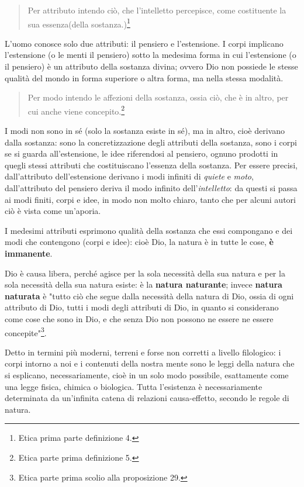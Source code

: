 \begin{quotation}
	\small Per attributo intendo ciò, che l'intelletto percepisce, come costituente la sua essenza(della sostanza.)\footnote{Etica prima parte definizione 4.}
\end{quotation}

L'uomo conosce solo due attributi: il pensiero e l'estensione. I corpi implicano l'estensione (o le menti il pensiero) sotto la medesima forma in cui l'estensione (o il pensiero) è un attributo della sostanza divina; ovvero Dio non possiede le stesse qualità del mondo in forma superiore o altra forma, ma nella stessa modalità.

\begin{quotation}
	\small Per modo intendo le affezioni della sostanza, ossia ciò, che è in altro, per cui anche viene concepito.\footnote{Etica parte prima definizione 5.}
\end{quotation}

I modi non sono in sé (solo la sostanza esiste in sé), ma in altro, cioè derivano dalla sostanza: sono la concretizzazione degli attributi della sostanza, sono i corpi se si guarda all'estensione, le idee riferendosi al pensiero, ognuno prodotti in quegli stessi attributi che costituiscano l'essenza della sostanza. Per essere precisi, dall'attributo dell'estensione derivano i modi infiniti di \textit{quiete} e \textit{moto}, dall'attributo del pensiero deriva il modo infinito dell'\textit{intelletto}: da questi si passa ai modi finiti, corpi e idee, in modo non molto chiaro, tanto che per alcuni autori ciò è vista come un'aporia.

I medesimi attributi esprimono qualità della sostanza che essi compongano e dei modi che contengono (corpi e idee): cioè Dio, la natura è in tutte le cose, \textbf{è immanente}.

Dio è causa libera, perché agisce per la sola necessità della sua natura e per la sola necessità della sua natura esiste: è la \textbf{natura naturante}; invece \textbf{natura naturata} è "tutto ciò che segue dalla necessità della natura di Dio, ossia di ogni attributo di Dio, tutti i modi degli attributi di Dio, in quanto si considerano come cose che sono in Dio, e che senza Dio non possono ne essere ne essere concepite"\footnote{Etica parte prima scolio alla proposizione 29.}.

Detto in termini più moderni, terreni e forse non corretti a livello filologico: i corpi intorno a noi e i contenuti della nostra mente sono le leggi della natura che si esplicano, necessariamente, cioè in un solo modo possibile, esattamente come una legge fisica, chimica o biologica. Tutta l'esistenza è necessariamente determinata da un'infinita catena di relazioni causa-effetto, secondo le regole di natura. 

